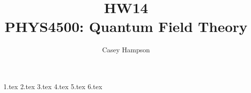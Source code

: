 \documentclass[titlepage]{article}
\title{HW14 \\[5pt] PHYS4500: Quantum Field Theory}
\author{Casey Hampson}
\begin{document}
    \maketitle
    \pagebreak

    {1.tex}
    {2.tex}
    {3.tex}
    {4.tex}
    {5.tex}
    {6.tex}
\end{document}

